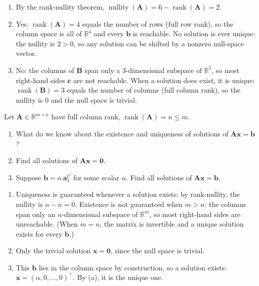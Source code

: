 \begin{solution}
    \begin{enumerate}[label=(\alph*)]
        \item By the rank-nullity theorem, $\operatorname{nullity}(\mathbf{A}) = 6 - \operatorname{rank}(\mathbf{A}) = 2$.
        \item Yes: $\operatorname{rank}(\mathbf{A}) = 4$ equals the number of rows (full row rank), so the column space is all of $\mathbb{R}^4$ and every $\mathbf{b}$ is reachable. No solution is ever unique: the nullity is $2 > 0$, so any solution can be shifted by a nonzero null-space vector.
        \item No: the columns of $\mathbf{B}$ span only a 3-dimensional subspace of $\mathbb{R}^5$, so most right-hand sides $\mathbf{c}$ are not reachable. When a solution does exist, it is unique: $\operatorname{rank}(\mathbf{B}) = 3$ equals the number of columns (full column rank), so the nullity is $0$ and the null space is trivial.
    \end{enumerate}
\end{solution}

\begin{exercise} %
    Let $\mathbf{A} \in \mathbb{R}^{m \times n}$ have full column rank, $\operatorname{rank}(\mathbf{A}) = n \leq m$.
    \begin{enumerate}[label=(\alph*)]
        \item What do we know about the existence and uniqueness of solutions of $\mathbf{A}\mathbf{x} = \mathbf{b}$?
        \item Find all solutions of $\mathbf{A}\mathbf{x} = \mathbf{0}$.
        \item Suppose $\mathbf{b} = \alpha\, \mathbf{a}^C_1$ for some scalar $\alpha$. Find all solutions of $\mathbf{A}\mathbf{x} = \mathbf{b}$.
    \end{enumerate}
\end{exercise}

\begin{solution}
    \begin{enumerate}[label=(\alph*)]
        \item Uniqueness is guaranteed whenever a solution exists: by rank-nullity, the nullity is $n - n = 0$. Existence is not guaranteed when $m > n$: the columns span only an $n$-dimensional subspace of $\mathbb{R}^m$, so most right-hand sides are unreachable. (When $m = n$, the matrix is invertible and a unique solution exists for every $\mathbf{b}$.)
        \item Only the trivial solution $\mathbf{x} = \mathbf{0}$, since the null space is trivial.
        \item This $\mathbf{b}$ lies in the column space by construction, so a solution exists: $\mathbf{x} = (\alpha, 0, \dots, 0)^\top$. By (a), it is the unique one.
    \end{enumerate}
\end{solution}

